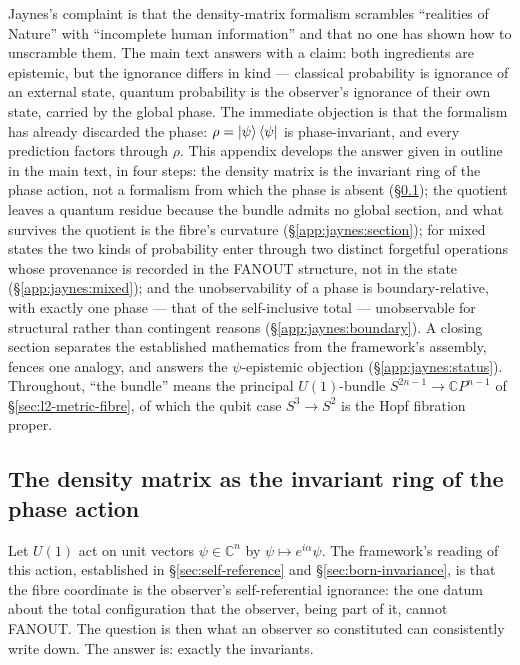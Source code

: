 Jaynes's complaint \autocite{Jaynes_89_a} is that the
density-matrix formalism scrambles ``realities of Nature'' with
``incomplete human information'' and that no one has shown how to
unscramble them. The main text answers with a claim: both ingredients
are epistemic, but the ignorance differs in kind --- classical
probability is ignorance of an external state, quantum probability is
the observer's ignorance of their own state, carried by the global
phase. The immediate objection is that the formalism has already
discarded the phase: $\rho = \ket{\psi}\bra{\psi}$ is phase-invariant,
and every prediction factors through $\rho$. This appendix develops
the answer given in outline in the main text, in four steps: the
density matrix is the invariant ring of the phase action, not a
formalism from which the phase is absent
(\S\ref{app:jaynes:invariants}); the quotient leaves a quantum residue
because the bundle admits no global section, and what survives the
quotient is the fibre's curvature (\S\ref{app:jaynes:section}); for
mixed states the two kinds of probability enter through two distinct
forgetful operations whose provenance is recorded in the FANOUT
structure, not in the state (\S\ref{app:jaynes:mixed}); and the
unobservability of a phase is boundary-relative, with exactly one
phase --- that of the self-inclusive total --- unobservable for
structural rather than contingent reasons
(\S\ref{app:jaynes:boundary}). A closing section separates the
established mathematics from the framework's assembly, fences one
analogy, and answers the $\psi$-epistemic objection
(\S\ref{app:jaynes:status}). Throughout, ``the bundle'' means the
principal $U(1)$-bundle $S^{2n-1} \to \mathbb{C}P^{n-1}$ of
\S\ref{sec:l2-metric-fibre}, of which the qubit case $S^{3} \to S^{2}$ is the
Hopf fibration proper.

\subsection{The density matrix as the invariant ring of the phase
  action}
\label{app:jaynes:invariants}

Let $U(1)$ act on unit vectors $\psi \in \mathbb{C}^{n}$ by
$\psi \mapsto e^{i\alpha}\psi$. The framework's reading of this
action, established in \S\ref{sec:self-reference} and
\S\ref{sec:born-invariance}, is that the fibre coordinate is the observer's
self-referential ignorance: the one datum about the total
configuration that the observer, being part of it, cannot FANOUT. The
question is then what an observer so constituted can consistently
write down. The answer is: exactly the invariants.

